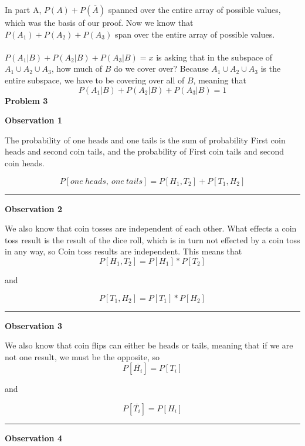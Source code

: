 \documentclass[11pt]{article}
\begin{document}
\begin{enumerate}
In part A, $P(A) + P(\overline{A})$ spanned over the entire array of possible values, which was the basis of our proof.  Now we know that $P(A_1) + P(A_2) + P(A_3)$ span over the entire array of possible values. \\ \\
$P(A_1|B) + P(A_2|B) + P(A_3|B) = x$ is asking that in the subspace of $A_1 \cup A_2 \cup A_3$, how much of $B$ do we cover over?  Because $A_1 \cup A_2 \cup A_3$ is the entire subspace, we have to be covering over all of $B$, meaning that $$P(A_1|B) + P(A_2|B) + P(A_3|B) = 1$$
\newpage
\textbf{Problem 3}
\\
\begin{center}
\textbf{Observation 1}
\end{center}
The probability of one heads and one tails is the sum of probability First coin heads and second coin tails, and the probability of First coin tails and second coin heads.

$$P[one\ heads,\ one\ tails] = P[H_1,T_2] + P[T_1, H_2]$$
\noindent\rule{20cm}{0.4pt}
\begin{center}
\textbf{Observation 2}
\end{center}
We also know that coin tosses are independent of each other.  What effects a coin toss result is the result of the dice roll, which is in turn not effected by a coin toss in any way, so Coin toss results are independent. This means that 
\\

$$ P[H_1, T_2] = P[H_1] * P[T_2]$$
\begin{center}
and
\end{center}
$$ P[T_1, H_2] = P[T_1] * P[H_2]$$
\noindent\rule{20cm}{0.4pt}
\begin{center}
\textbf{Observation 3}
\end{center}
We also know that coin flips can either be heads or tails, meaning that if we are not one result, we must be the opposite, so 
$$P[\overline{H_i}] = P[T_i]$$
\begin{center}
and
\end{center}
$$P[\overline{T_i}] = P[H_i]$$
\noindent\rule{20cm}{0.4pt}
\begin{center}
\textbf{Observation 4}
\end{center}


\end{enumerate}
\end{document}

